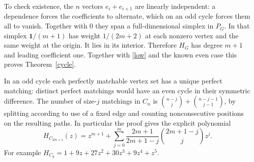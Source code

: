 \documentclass[11pt]{article}
\newcommand{\one}{\mathbf1}
\begin{document}
To check existence, the $n$ vectors $e_i+e_{i+1}$ are linearly independent: a dependence forces the coefficients to alternate, which on an odd cycle forces them all to vanish. Together with $0$ they span a full-dimensional simplex in $P_G$. In that simplex $\one/(m+1)$ has weight $1/(2m+2)$ at each nonzero vertex and the same weight at the origin. It lies in its interior. Therefore $H_G$ has degree $m+1$ and leading coefficient one. Together with \eqref{low} and the known even case this proves Theorem~\ref{cycle}.

In an odd cycle each perfectly matchable vertex set has a unique perfect matching: distinct perfect matchings would have an even cycle in their symmetric difference. The number of size-$j$ matchings in $C_n$ is $\binom{n-j}{j}+\binom{n-j-1}{j-1}$, by splitting according to use of a fixed edge and counting nonconsecutive positions on the resulting paths. In particular the proof gives the explicit polynomial
\[
 H_{C_{2m+1}}(z)=z^{m+1}+\sum_{j=0}^{m}\frac{2m+1}{2m+1-j}\binom{2m+1-j}{j}z^j .
\]
For example $H_{C_9}=1+9z+27z^2+30z^3+9z^4+z^5$.
\end{document}
